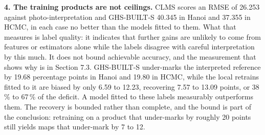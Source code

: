 \documentclass[11pt,a4paper]{article}
\begin{document}
\textbf{4. The training products are not ceilings.} CLMS scores an RMSE of 26.253
against photo-interpretation and GHS-BUILT-S 40.345 in Hanoi and 37.355 in HCMC,
in each case no better than the models fitted to them. What that measures is
label quality: it indicates that further gains are unlikely to come from
features or estimators alone while the labels disagree with careful
interpretation by this much. It does not bound achievable accuracy, and the
measurement that shows why is in Section 7.3. GHS-BUILT-S under-marks the
interpreted reference by 19.68 percentage points in Hanoi and 19.80 in HCMC,
while the local retrains fitted to it are biased by only 6.59 to 12.23,
recovering 7.57 to 13.09 points, or 38\,\% to 67\,\% of the deficit. A model fitted
to these labels measurably outperforms them. The recovery is bounded rather than
complete, and the bound is part of the conclusion: retraining on a product that
under-marks by roughly 20 points still yields maps that under-mark by 7 to 12.

\renewcommand{\refname}{References}

\end{document}
